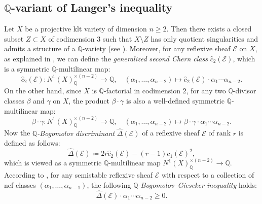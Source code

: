\documentclass[12pt,twoside]{amsart}
\theoremstyle{definition}
\begin{document}
\subsection{$\mathbb{Q}$-variant of Langer's inequality}

Let $X$ be a projective klt variety of dimension $n\geq 2$. Then there exists a closed subset $Z\subset X$ of codimension $3$ such that $X\setminus Z$ has only quotient singularities and admits a structure of a $\mathbb{Q}$-variety (see \cite[\S\,3.2 and \S\,3.6]{GrebKebekusPeternellTaji2019a}). Moreover, for any reflexive sheaf $\mathcal{E}$ on $X$, as explained in \cite[Construction~3.8 and \S\,3.7]{GrebKebekusPeternellTaji2019a}, we can define the \emph{generalized second Chern class} $\hat{c}_2(\mathcal{E})$, which is a symmetric $\mathbb{Q}$-multilinear map:
\[
 \hat{c}_2(\mathcal{E})\colon N^1(X)_{\mathbb{Q}}^{\times (n-2)} \longrightarrow \mathbb{Q},\quad (\alpha_1,\dots,\alpha_{n-2})\longmapsto \hat{c}_2(\mathcal{E})\cdot \alpha_1\cdots\alpha_{n-2}.
\]
On the other hand, since $X$ is $\mathbb{Q}$-factorial in codimension $2$, for any two $\mathbb{Q}$-divisor classes $\beta$ and $\gamma$ on $X$, the product $\beta\cdot \gamma$ is also a well-defined symmetric $\mathbb{Q}$-multilinear map:
\[
 \beta\cdot \gamma\colon N^1(X)_{\mathbb{Q}}^{\times (n-2)}\longrightarrow \mathbb{Q},\quad (\alpha_1,\dots,\alpha_{n-2})\longmapsto \beta\cdot \gamma\cdot \alpha_1\cdots\alpha_{n-2}.
\]
Now the \emph{$\mathbb{Q}$-Bogomolov discriminant} $\hat{\Delta}(\mathcal{E})$ of a reflexive sheaf $\mathcal{E}$ of rank $r$ is defined as follows:
	\[
	\hat{\Delta}(\mathcal{E})\coloneqq 2r \hat{c}_2(\mathcal{E}) - (r-1) c_1(\mathcal{E})^2,
	\]
which is viewed as a symmetric $\mathbb{Q}$-multilinear map $N^1(X)_{\mathbb{Q}}^{\times (n-2)}\rightarrow \mathbb{Q}$. According to \cite[Lemma~6.5]{KeelMatsukiMcKernan1994}, for any semistable reflexive sheaf $\mathcal{E}$ with respect to a collection of nef classes $(\alpha_1,\dots,\alpha_{n-1})$, the following \emph{$\mathbb{Q}$-Bogomolov--Gieseker inequality} holds:
\begin{equation}\label{eq.BGineq}
 \hat{\Delta}(\mathcal{E})\cdot \alpha_1\cdots\alpha_{n-2} \geq 0.
\end{equation}
\end{document}
